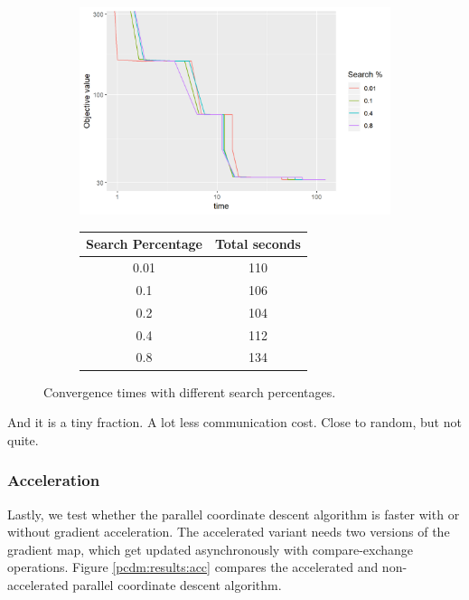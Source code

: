 \begin{figure}[h]
	\centering
	\begin{subfigure}{0.6\linewidth}
		\includegraphics[width=1.0\linewidth]{./chapters/05.pcdm/parameters/searchPercent.png}
	\end{subfigure}
	\begin{subfigure}{0.35\linewidth}
		\begin{tabular}{c | c}
			Search Percentage & Total seconds \\ \hline
			0.01 & 110 \\
			0.1 & 106 \\
			0.2 & 104 \\
			0.4 & 112 \\
			0.8 & 134 \\
		\end{tabular}
	\end{subfigure}
	\caption{Convergence times with different search percentages.}
	\label{pcdm:results:search}
\end{figure}

And it is a tiny fraction. A lot less communication cost. Close to random, but not quite.


\subsubsection{Acceleration}
Lastly, we test whether the parallel coordinate descent algorithm is faster with or without gradient acceleration. The accelerated variant needs two versions of the gradient map, which get updated asynchronously with compare-exchange operations. Figure \ref{pcdm:results:acc} compares the accelerated and non-accelerated parallel coordinate descent algorithm.

